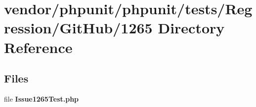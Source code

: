 \section{vendor/phpunit/phpunit/tests/\+Regression/\+Git\+Hub/1265 Directory Reference}
\label{dir_920dd9ce5e299ffc4d9d54699ae97592}
\subsection*{Files}
\begin{DoxyCompactItemize}
\item 
file {\bf Issue1265\+Test.\+php}
\end{DoxyCompactItemize}
